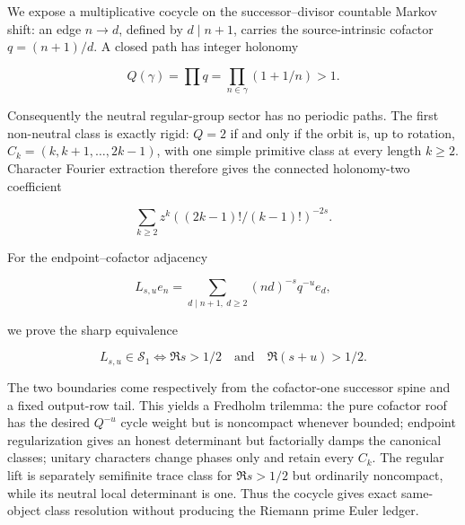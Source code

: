 We expose a multiplicative cocycle on the successor--divisor countable
Markov shift: an edge \(n\to d\), defined by \(d\mid n+1\), carries the
source-intrinsic cofactor \(q=(n+1)/d\).  A closed path has integer holonomy

\[
 Q(\gamma)=\prod q
 =\prod_{n\in\gamma}(1+1/n)>1.
\]

Consequently the neutral regular-group sector has no periodic paths.  The
first non-neutral class is exactly rigid: \(Q=2\) if and only if the orbit is,
up to rotation,
\(C_k=(k,k+1,\ldots,2k-1)\), with one simple primitive class at every length
\(k\ge2\).  Character Fourier extraction therefore gives the connected
holonomy-two coefficient

\[
 \sum_{k\ge2}z^k
 \left((2k-1)!/(k-1)!\right)^{-2s}.
\]

For the endpoint--cofactor adjacency

\[
 L_{s,u}e_n=\sum_{d\mid n+1,\ d\ge2}(nd)^{-s}q^{-u}e_d,
\]

we prove the sharp equivalence

\[
 L_{s,u}\in\mathcal S_1
 \iff \Re s>1/2\quad\text{and}\quad\Re(s+u)>1/2.
\]

The two boundaries come respectively from the cofactor-one successor spine
and a fixed output-row tail.  This yields a Fredholm trilemma: the pure
cofactor roof has the desired \(Q^{-u}\) cycle weight but is noncompact
whenever bounded; endpoint regularization gives an honest determinant but
factorially damps the canonical classes; unitary characters change phases
only and retain every \(C_k\).  The regular lift is separately semifinite
trace class for \(\Re s>1/2\) but ordinarily noncompact, while its neutral
local determinant is one.  Thus the cocycle gives exact same-object class
resolution without producing the Riemann prime Euler ledger.
